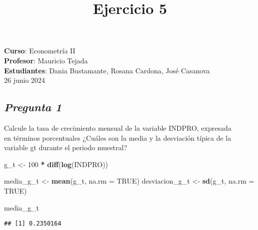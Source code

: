 \documentclass[
  12pt,
]{article}
\title{\textbf{Ejercicio 5}}
\author{}
\date{\vspace{-2.5em}}
\newenvironment{Shaded}{\begin{snugshade}}{\end{snugshade}}
\newcommand{\AttributeTok}[1]{\textcolor[rgb]{0.13,0.29,0.53}{#1}}
\newcommand{\ConstantTok}[1]{\textcolor[rgb]{0.56,0.35,0.01}{#1}}
\newcommand{\DecValTok}[1]{\textcolor[rgb]{0.00,0.00,0.81}{#1}}
\newcommand{\FunctionTok}[1]{\textcolor[rgb]{0.13,0.29,0.53}{\textbf{#1}}}
\newcommand{\NormalTok}[1]{#1}
\newcommand{\OtherTok}[1]{\textcolor[rgb]{0.56,0.35,0.01}{#1}}
\newcommand{\SpecialCharTok}[1]{\textcolor[rgb]{0.81,0.36,0.00}{\textbf{#1}}}
\begin{document}
\maketitle

\maketitle
\vspace{-5em}
\vspace{0.5em}

\begin{center}
\footnotesize \textbf{Curso}: Econometría II \\
\footnotesize \textbf{Profesor}: Mauricio Tejada \\
\footnotesize \textbf{Estudiantes}: Dania Bustamante, Rosana Cardona, José Casanova \\
\footnotesize 26 junio 2024 \\
\end{center}

\subsection{\texorpdfstring{\textbf{\emph{Pregunta
1}}}{Pregunta 1}}\label{pregunta-1}

Calcule la tasa de crecimiento mensual de la variable INDPRO,
expresada\\
en términos porcentuales ¿Cuáles son la media y la desviación típica de
la variable gt durante el periodo muestral?

\begin{Shaded}
\begin{Highlighting}[]
\NormalTok{g\_t }\OtherTok{\textless{}{-}} \DecValTok{100} \SpecialCharTok{*} \FunctionTok{diff}\NormalTok{(}\FunctionTok{log}\NormalTok{(INDPRO))}

\NormalTok{media\_g\_t }\OtherTok{\textless{}{-}} \FunctionTok{mean}\NormalTok{(g\_t, }\AttributeTok{na.rm =} \ConstantTok{TRUE}\NormalTok{)}
\NormalTok{desviacion\_g\_t }\OtherTok{\textless{}{-}} \FunctionTok{sd}\NormalTok{(g\_t, }\AttributeTok{na.rm =} \ConstantTok{TRUE}\NormalTok{)}

\NormalTok{media\_g\_t}
\end{Highlighting}
\end{Shaded}

\begin{verbatim}
## [1] 0.2350164
\end{verbatim}
\end{document}
